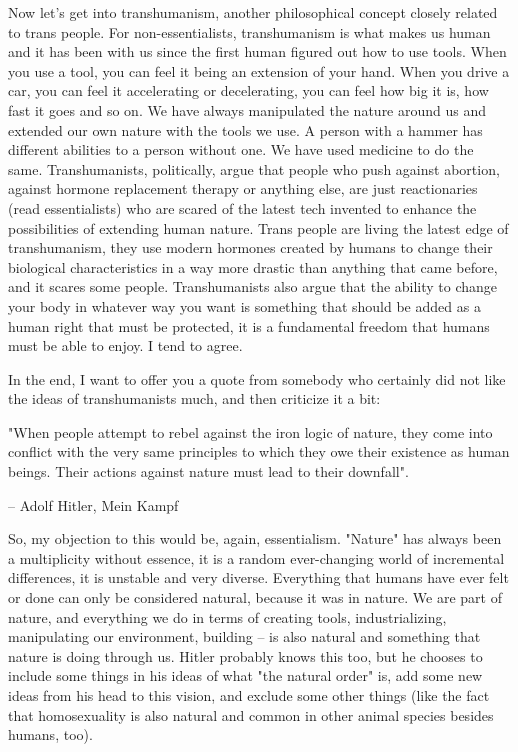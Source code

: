 \documentclass[12 pt, a4paper]{article}
\begin{document}
Now let's get into transhumanism, another philosophical concept closely related to trans people. For non-essentialists, transhumanism is what makes us human and it has been with us since the first human figured out how to use tools. When you use a tool, you can feel it being an extension of your hand. When you drive a car, you can feel it accelerating or decelerating, you can feel how big it is, how fast it goes and so on. We have always manipulated the nature around us and extended our own nature with the tools we use. A person with a hammer has different abilities to a person without one. We have used medicine to do the same. Transhumanists, politically, argue that people who push against abortion, against hormone replacement  therapy or anything else, are just reactionaries (read essentialists) who are scared of the latest tech invented to enhance the possibilities of extending human nature. Trans people are living the latest edge of transhumanism, they use modern hormones created by humans to change their biological characteristics in a way more drastic than anything that came before, and it scares some people. Transhumanists also argue that the ability to change your body in whatever way you want is something that should be added as a human right that must be protected, it is a fundamental freedom that humans must be able to enjoy. I tend to agree.  

In the end, I want to offer you a quote from somebody who certainly did not like the ideas of transhumanists much, and then criticize it a bit: 

"When people attempt to rebel against the iron logic of nature, they come into conflict with the very same principles to which they owe their existence as human beings. Their actions against nature must lead to their downfall". 

– Adolf Hitler, Mein Kampf 

So, my objection to this would be, again, essentialism. "Nature" has always been a multiplicity without essence, it is a random ever-changing world of incremental differences, it is unstable and very diverse. Everything that humans have ever felt or done can only be considered natural, because it was in nature. We are part of nature, and everything we do in terms of creating tools, industrializing, manipulating our environment, building – is also natural and something that nature is doing through us. Hitler probably knows this too, but he chooses to include some things in his ideas of what "the natural order" is, add some new ideas from his head to this vision, and exclude some other things (like the fact that homosexuality is also natural and common in other animal species besides humans, too). 
\end{document}
